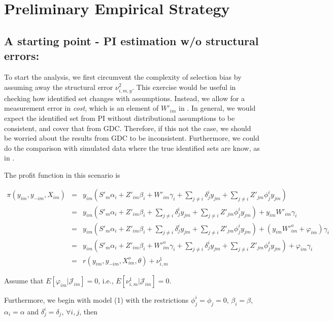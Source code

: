 \documentclass[a4paper]{article}
\begin{document}
\section{Preliminary Empirical Strategy}\label{es}

\subsection{A starting point - PI estimation w/o structural errors:}

To start the analysis, we first circumvent the complexity of selection bias by assuming away the structural error $\nu_{i,m,y}^2$. This exercise would be useful in checking how identified set changes with assumptions. Instead, we allow for a measurement error in \textit{cost}, which is an element of $W'_{im}$ in \cite{ciliberto2009market}. In general, we would expect the identified set from PI without distributional assumptions to be consistent, and cover that from GDC. Therefore, if this not the case, we should be worried about the results from GDC to be inconsistent. Furthermore, we could do the comparison with simulated data where the true identified sets are know, as in \cite{pakes2015moment}.


The profit function in this scenario is

\begin{eqnarray}
\pi(y_{im},y_{-im},X_{im}) &=& y_{im}(S'_m\alpha_i+Z'_{im}\beta_i+W'_{im} \gamma_i+\sum_{j\neq i}\delta_{j}^i y_{jm}+\sum_{j\neq i}Z'_{jm}\phi_j^iy_{jm})  \nonumber \\
&=& y_{im}(S'_m\alpha_i+Z'_{im}\beta_i +\sum_{j\neq i}\delta_{j}^i y_{jm}+\sum_{j\neq i}Z'_{jm}\phi_j^iy_{jm}) + y_{im} W'_{im} \gamma_i \nonumber \\
&=& y_{im}(S'_m\alpha_i+Z'_{im}\beta_i +\sum_{j\neq i}\delta_{j}^i y_{jm}+\sum_{j\neq i}Z'_{jm}\phi_j^iy_{jm}) + (y_{im} W'^o_{im}  + \varphi_{im})\gamma_i\nonumber \\
&=& y_{im}(S'_m\alpha_i+Z'_{im}\beta_i+ W'^o_{im}\gamma_i+\sum_{j\neq i}\delta_{j}^i y_{jm}+\sum_{j\neq i}Z'_{jm}\phi_j^iy_{jm}) + \varphi_{im}\gamma_{i}\nonumber \\
&=& r(y_{im},y_{-im},X^o_{im}, \theta) + \nu^1_{i,m} 
\label{profit_PI}
\end{eqnarray}


Assume that $E[\varphi_{im}|\mathcal{J}_{im}] = 0$, i.e., $E[\nu^1_{i,m}|\mathcal{J}_{im}] = 0$.

Furthermore, we begin with model (1) with the restrictions $\phi^i_j = \phi_j = 0$, $\beta_i=\beta$, $\alpha_i = \alpha$ and $\delta^i_j = \delta_j$, $\forall i, j$, then
\end{document}
